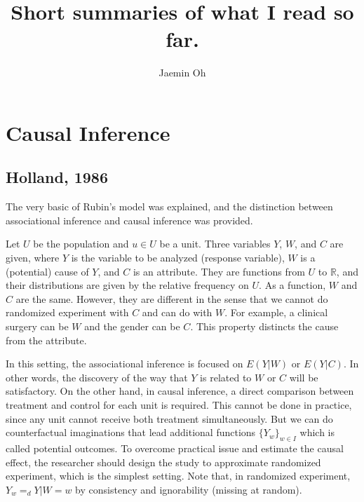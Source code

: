 \documentclass[12pt]{article}
\author[1]{Jaemin Oh}
\title{
	Short summaries of what I read so far.
	} %
\begin{document}
\maketitle

\section{Causal Inference}

\subsection{Holland, 1986 \cite{holland1986}}
The very basic of Rubin's model was explained,
and the distinction between associational inference and causal inference was provided.

Let $U$ be the population and $u \in U$ be a unit.
Three variables $Y$, $W$, and $C$ are given,
where $Y$ is the variable to be analyzed (response variable),
$W$ is a (potential) cause of $Y$,
and $C$ is an attribute.
They are functions from $U$ to $\mathbb{R}$,
and their distributions are given by the relative frequency on $U$.
As a function, $W$ and $C$ are the same.
However, they are different in the sense that
we cannot do randomized experiment with $C$
and can do with $W$.
For example, a clinical surgery can be $W$ and the gender can be $C$.
This property distincts the cause from the attribute.

In this setting, the associational inference is focused on $E(Y\lvert W)$ or $E(Y \lvert C)$.
In other words, the discovery of the way that $Y$ is related to $W$ or $C$ will be satisfactory.
%
On the other hand, in causal inference, 
a direct comparison between treatment and control for each unit is required.
This cannot be done in practice, since any unit cannot receive both treatment simultaneously.
But we can do counterfactual imaginations that lead additional functions $\{Y_w\}_{w\in I}$
which is called potential outcomes.
To overcome practical issue and estimate the causal effect,
the researcher should design the study to approximate randomized experiment,
which is the simplest setting.
%
Note that, in randomized experiment, 
$Y_w =_d Y\lvert W = w$ by consistency and ignorability (missing at random).










\end{document}
